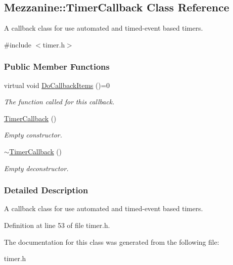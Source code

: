 \hypertarget{classMezzanine_1_1TimerCallback}{
\subsection{Mezzanine::TimerCallback Class Reference}
\label{classMezzanine_1_1TimerCallback}
}


A callback class for use automated and timed-\/event based timers.  




{\ttfamily \#include $<$timer.h$>$}

\subsubsection*{Public Member Functions}
\begin{DoxyCompactItemize}
\item 
\hypertarget{classMezzanine_1_1TimerCallback_a2a4d7964f1867713ba472dc4c94361a8}{
virtual void \hyperlink{classMezzanine_1_1TimerCallback_a2a4d7964f1867713ba472dc4c94361a8}{DoCallbackItems} ()=0}
\label{classMezzanine_1_1TimerCallback_a2a4d7964f1867713ba472dc4c94361a8}

\begin{DoxyCompactList}\small\item\em The function called for this callback. \item\end{DoxyCompactList}\item 
\hypertarget{classMezzanine_1_1TimerCallback_ae6152f02cb5ddf36f76f0b892e18d065}{
\hyperlink{classMezzanine_1_1TimerCallback_ae6152f02cb5ddf36f76f0b892e18d065}{TimerCallback} ()}
\label{classMezzanine_1_1TimerCallback_ae6152f02cb5ddf36f76f0b892e18d065}

\begin{DoxyCompactList}\small\item\em Empty constructor. \item\end{DoxyCompactList}\item 
\hypertarget{classMezzanine_1_1TimerCallback_a589a3635b86895c849401b7b3d050e20}{
\hyperlink{classMezzanine_1_1TimerCallback_a589a3635b86895c849401b7b3d050e20}{$\sim$TimerCallback} ()}
\label{classMezzanine_1_1TimerCallback_a589a3635b86895c849401b7b3d050e20}

\begin{DoxyCompactList}\small\item\em Empty deconstructor. \item\end{DoxyCompactList}\end{DoxyCompactItemize}


\subsubsection{Detailed Description}
A callback class for use automated and timed-\/event based timers. 

Definition at line 53 of file timer.h.



The documentation for this class was generated from the following file:\begin{DoxyCompactItemize}
\item 
timer.h\end{DoxyCompactItemize}
